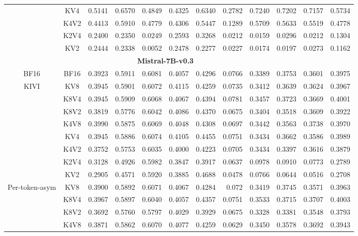 \begin{table}[ht]
{\begin{tabular}{ c c | r r r r r r r r r | r  }
& KV4 & 0.5141 & 0.6570 & 0.4849 & 0.4325 & 0.6340 & 0.2782 & 0.7240 & 0.7202 & 0.7157 & 0.5734 \\
& K4V2 & 0.4413 & 0.5910 & 0.4779 & 0.4306 & 0.5447 & 0.1289 & 0.5709 & 0.5633 & 0.5519 & \colorbox{blue!30}{0.4778} \\
& K2V4 & 0.2400 & 0.2350 & 0.0249 & 0.2593 & 0.3268 & 0.0212 & 0.0159 & 0.0296 & 0.0212 & \colorbox{blue!30}{0.1304} \\
& KV2 & 0.2444 & 0.2338 & 0.0052 & 0.2478 & 0.2277 & 0.0227 & 0.0174 & 0.0197 & 0.0273 & \colorbox{blue!30}{0.1162}\\\hline
\multicolumn{11}{c}{\textbf{Mistral-7B-v0.3}} \\ \hline
\multirow{1}{*}{BF16}
& BF16 & 0.3923 & 0.5911 & 0.6081 & 0.4057 & 0.4296 & 0.0766 & 0.3389 & 0.3753 & 0.3601 & 0.3975 \\\hline
\multirow{8}{*}{KIVI}
& KV8 & 0.3945 & 0.5901 & 0.6072 & 0.4115 & 0.4259 & 0.0735 & 0.3412 & 0.3639 & 0.3624 & 0.3967 \\
& K8V4 & 0.3945 & 0.5909 & 0.6068 & 0.4067 & 0.4394 & 0.0781 & 0.3457 & 0.3723 & 0.3669 & 0.4001 \\
& K8V2 & 0.3819 & 0.5776 & 0.6042 & 0.4086 & 0.4370 & 0.0675 & 0.3404 & 0.3518 & 0.3609 & 0.3922 \\
& K4V8 & 0.3990 & 0.5875 & 0.6069 & 0.4048 & 0.4308 & 0.0697 & 0.3442 & 0.3563 & 0.3738 & 0.3970 \\
& KV4 & 0.3945 & 0.5886 & 0.6074 & 0.4105 & 0.4455 & 0.0751 & 0.3434 & 0.3662 & 0.3586  & 0.3989 \\
& K4V2 & 0.3752 & 0.5753 & 0.6035 & 0.4000 & 0.4223 & 0.0705 & 0.3434 & 0.3397 & 0.3616 & 0.3879 \\
& K2V4 & 0.3128 & 0.4926 & 0.5982 & 0.3847 & 0.3917 & 0.0637 & 0.0978 & 0.0910 & 0.0773 & \colorbox{blue!30}{0.2789} \\
& KV2 & 0.2905 & 0.4571 & 0.5920 & 0.3885 & 0.4688 & 0.0478 & 0.0766 & 0.0644 & 0.0516 & \colorbox{blue!30}{0.2708} \\\hline
\multirow{8}{*}{Per-token-asym}
& KV8 & 0.3900 & 0.5892 & 0.6071 & 0.4067 & 0.4284 & 0.072 & 0.3419 & 0.3745 & 0.3571 & 0.3963 \\
& K8V4 & 0.3967 & 0.5897 & 0.6040 & 0.4057 & 0.4357 & 0.0751 & 0.3533 & 0.3715 & 0.3707 & 0.4003 \\
& K8V2 & 0.3692 & 0.5760 & 0.5797 & 0.4029 & 0.3929 & 0.0675 & 0.3328 & 0.3381 & 0.3548 & 0.3793 \\
& K4V8 & 0.3871 & 0.5862 & 0.6070 & 0.4077 & 0.4259 & 0.0629 & 0.3450 & 0.3578 & 0.3692 & 0.3943 \\

\end{tabular}}
\end{table}
